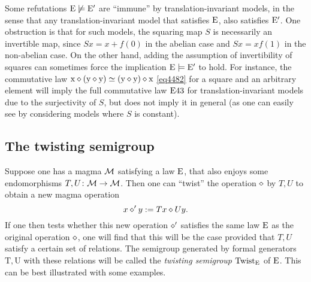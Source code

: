   Some refutations $\mathrm{E} \not\models {\mathrm{E}'}$ are ``immune'' by translation-invariant models, in the sense that any translation-invariant model that satisfies $\mathrm{E}$, also satisfies ${\mathrm{E}'}$.  One obstruction is that for such models, the squaring map $S$ is necessarily an invertible map, since $Sx = x + f(0)$ in the abelian case and $Sx = xf(1)$ in the non-abelian case. On the other hand, adding the assumption of invertibility of squares can sometimes force the implication $\mathrm{E} \models {\mathrm{E}'}$ to hold.  For instance, the commutative law $\mathrm{x} \diamond (\mathrm{y} \diamond \mathrm{y}) \simeq (\mathrm{y} \diamond \mathrm{y}) \diamond \mathrm{x}$ \eqref{eq4482} for a square and an arbitrary element will imply the full commutative law $\mathrm{E}43$ for translation-invariant models due to the surjectivity of $S$, but does not imply it in general (as one can easily see by considering models where $S$ is constant).

\subsection{The twisting semigroup}\label{twisting-sec}

Suppose one has a magma ${\mathcal{M}}$ satisfying a law $\mathrm{E}$, that also enjoys some endomorphisms $T, U \colon {\mathcal{M}} \to {\mathcal{M}}$.  Then one can ``twist'' the operation $\diamond$ by $T,U$ to obtain a new magma operation
\begin{equation}\label{twist} x \diamond' y := Tx \diamond Uy.
\end{equation}
If one then tests whether this new operation $\diamond'$ satisfies the same law $\mathrm{E}$ as the original operation $\diamond$, one will find that this will be the case provided that $T,U$ satisfy a certain set of relations.  The semigroup generated by formal generators $\mathrm{T}, \mathrm{U}$ with these relations will be called the \emph{twisting semigroup} $\operatorname{Twist}_{\mathrm{E}}$ of $\mathrm{E}$.  This can be best illustrated with some examples.

